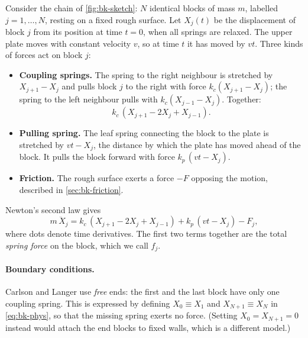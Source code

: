 Consider the chain of \cref{fig:bk-sketch}: $N$ identical blocks of mass $m$, labelled
$j=1,\dots,N$, resting on a fixed rough surface. Let $X_j(t)$ be the displacement of block $j$ from
its position at time $t=0$, when all springs are relaxed. The upper plate moves with constant velocity
$v$, so at time $t$ it has moved by $vt$. Three kinds of forces act on block $j$:
\begin{itemize}
  \item \textbf{Coupling springs.} The spring to the right neighbour is stretched by $X_{j+1}-X_j$ and
    pulls block $j$ to the right with force $k_c(X_{j+1}-X_j)$; the spring to the left neighbour pulls
    with $k_c(X_{j-1}-X_j)$. Together:
    \begin{equation}
      k_c\,(X_{j+1} - 2X_j + X_{j-1}).
    \end{equation}
  \item \textbf{Pulling spring.} The leaf spring connecting the block to the plate is stretched by
    $vt - X_j$, the distance by which the plate has moved ahead of the block. It pulls the block
    forward with force $k_p\,(vt - X_j)$.
  \item \textbf{Friction.} The rough surface exerts a force $-F$ opposing the motion, described in
    \cref{sec:bk-friction}.
\end{itemize}
Newton's second law gives
\begin{equation}
  m\,\ddot X_j = k_c\,(X_{j+1} - 2X_j + X_{j-1}) + k_p\,(vt - X_j) - F_j ,
  \label{eq:bk-phys}
\end{equation}
where dots denote time derivatives. The first two terms together are the total \emph{spring force}
on the block, which we call $f_j$.

\paragraph{Boundary conditions.} Carlson and Langer use \emph{free} ends: the first and the last block
have only one coupling spring. This is expressed by defining $X_0\equiv X_1$ and $X_{N+1}\equiv X_N$ in
\cref{eq:bk-phys}, so that the missing spring exerts no force. (Setting $X_0 = X_{N+1}=0$ instead would
attach the end blocks to fixed walls, which is a different model.)

